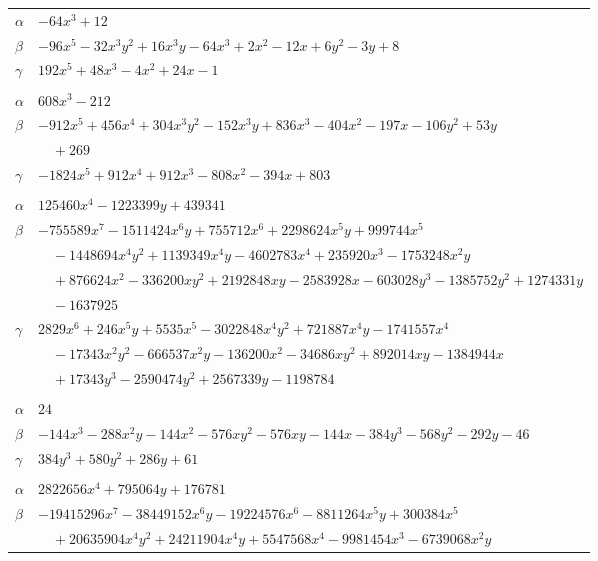 \documentclass[11pt]{article}
\begin{document}
\begin{longtable}{@{}ll@{}}
$\alpha$ & $-64x^{3}+12$\\
$\beta$ & $-96x^{5}-32x^{3}y^{2}+16x^{3}y-64x^{3}+2x^{2}-12x+6y^{2}-3y+8$\\
$\gamma$ & $192x^{5}+48x^{3}-4x^{2}+24x-1$\\
\addlinespace[3pt]
\multicolumn{2}{@{}l}{$\{i,j\}=\{12,74\}$, $k_{ij}=3^{2}\cdot 5^{3}$}\\
$\alpha$ & $608x^{3}-212$\\
$\beta$ & $-912x^{5}+456x^{4}+304x^{3}y^{2}-152x^{3}y+836x^{3}-404x^{2}-197x-106y^{2}+53y$\\
 & $\quad +269$\\
$\gamma$ & $-1824x^{5}+912x^{4}+912x^{3}-808x^{2}-394x+803$\\
\addlinespace[3pt]
\multicolumn{2}{@{}l}{$\{i,j\}=\{13,49\}$, $k_{ij}=2^{3}\cdot 5^{2}$}\\
$\alpha$ & $125460x^{4}-1223399y+439341$\\
$\beta$ & $-755589x^{7}-1511424x^{6}y+755712x^{6}+2298624x^{5}y+999744x^{5}$\\
 & $\quad -1448694x^{4}y^{2}+1139349x^{4}y-4602783x^{4}+235920x^{3}-1753248x^{2}y$\\
 & $\quad +876624x^{2}-336200xy^{2}+2192848xy-2583928x-603028y^{3}-1385752y^{2}+1274331y$\\
 & $\quad -1637925$\\
$\gamma$ & $2829x^{6}+246x^{5}y+5535x^{5}-3022848x^{4}y^{2}+721887x^{4}y-1741557x^{4}$\\
 & $\quad -17343x^{2}y^{2}-666537x^{2}y-136200x^{2}-34686xy^{2}+892014xy-1384944x$\\
 & $\quad +17343y^{3}-2590474y^{2}+2567339y-1198784$\\
\addlinespace[3pt]
\multicolumn{2}{@{}l}{$\{i,j\}=\{14,18\}$, $k_{ij}=3^{2}$}\\
$\alpha$ & $24$\\
$\beta$ & $-144x^{3}-288x^{2}y-144x^{2}-576xy^{2}-576xy-144x-384y^{3}-568y^{2}-292y-46$\\
$\gamma$ & $384y^{3}+580y^{2}+286y+61$\\
\addlinespace[3pt]
\multicolumn{2}{@{}l}{$\{i,j\}=\{14,39\}$, $k_{ij}=2$}\\
$\alpha$ & $2822656x^{4}+795064y+176781$\\
$\beta$ & $-19415296x^{7}-38449152x^{6}y-19224576x^{6}-8811264x^{5}y+300384x^{5}$\\
 & $\quad +20635904x^{4}y^{2}+24211904x^{4}y+5547568x^{4}-9981454x^{3}-6739068x^{2}y$\\

\end{longtable}
\end{document}
